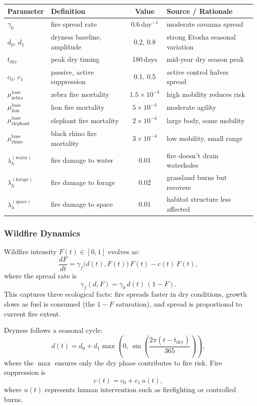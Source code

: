 \begin{center}
\begin{tabular}{l l c l}
\hline
\textbf{Parameter} & \textbf{Definition} & \textbf{Value} & \textbf{Source / Rationale} \\
\hline
$\gamma_0$ & fire spread rate & 0.6\,day$^{-1}$ & moderate savanna spread \\
$d_0,\,d_1$ & dryness baseline, amplitude & 0.2, 0.8 & strong Etosha seasonal variation \\
$t_{\text{dry}}$ & peak dry timing & 180\,days & mid-year dry season peak \\
$c_0,\,c_1$ & passive, active suppression & 0.1, 0.5 & active control halves spread \\
$\mu_{\text{zebra}}^{\text{base}}$ & zebra fire mortality & $1.5 \times 10^{-4}$ & high mobility reduces risk \\
$\mu_{\text{lion}}^{\text{base}}$ & lion fire mortality & $5 \times 10^{-4}$ & moderate agility \\
$\mu_{\text{elephant}}^{\text{base}}$ & elephant fire mortality & $2 \times 10^{-4}$ & large body, some mobility \\
$\mu_{\text{rhino}}^{\text{base}}$ & black rhino fire mortality & $3 \times 10^{-4}$ & low mobility, small range \cite{emslie1999rhino} \\
$\lambda_h^{(\text{water})}$ & fire damage to water & 0.01 & fire doesn't drain waterholes \\
$\lambda_h^{(\text{forage})}$ & fire damage to forage & 0.02 & grassland burns but recovers \\
$\lambda_h^{(\text{space})}$ & fire damage to space & 0.01 & habitat structure less affected \\
\hline
\end{tabular}
\end{center}

\subsubsection{Wildfire Dynamics}

Wildfire intensity $F(t) \in [0,1]$ evolves as:
\[
\frac{dF}{dt} = \gamma_f\bigl(d(t), F(t)\bigr)\,F(t) - c(t)\,F(t),
\]
where the spread rate is
\[
\gamma_f(d,F) = \gamma_0\,d(t)\,(1-F).
\]
This captures three ecological facts: fire spreads faster in dry conditions, growth slows as fuel is consumed (the $1-F$ saturation), and spread is proportional to current fire extent.

Dryness follows a seasonal cycle:
\[
d(t) = d_0 + d_1\max\!\left(0,\,\sin\!\left(\frac{2\pi(t - t_{\text{dry}})}{365}\right)\right),
\]
where the $\max$ ensures only the dry phase contributes to fire risk. Fire suppression is
\[
c(t) = c_0 + c_1\,u(t),
\]
where $u(t)$ represents human intervention such as firefighting or controlled burns.

